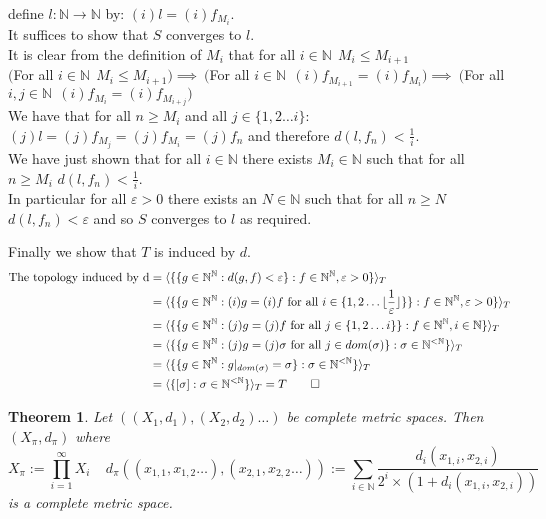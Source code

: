 \documentclass{report}
\newtheorem{theorem}{Theorem}[section]
\begin{document}
define $l:\mathbb{N}\rightarrow\mathbb{N}$ by: $(i)l=(i)f_{M_i}$.\\
It suffices to show that $S$ converges to $l$.\\
It is clear from the definition of $M_i$ that for all $i\in \mathbb{N}\ \  M_i \leq M_{i+1}$\\
$($For all $i\in \mathbb{N}\ \  M_i \leq M_{i+1})\implies\ ($For all $i\in \mathbb{N}\ \ (i)f_{M_{i+1}}=(i)f_{M_{i}}) \implies\ ($For all $i,j\in \mathbb{N}\ \ (i)f_{M_{i}}=(i)f_{M_{i+j}})$\\
We have that for all $n \geq M_i$ and all $j \in \{1,2\ldots i\}$: $(j)l=(j)f_{M_j}=(j)f_{M_i}=(j)f_n$ and therefore $d(l,f_n) < \frac{1}{i}$.\\
We have just shown that for all $i \in \mathbb{N}$ there exists $M_i\in\mathbb{N}$ such that for all $n\geq M_i$ $d(l,f_n)< \frac{1}{i}$.\\
In particular for all $\varepsilon > 0$ there exists an $N\in\mathbb{N}$ such that for all $n\geq N$ $d(l,f_n)<\varepsilon$ and so $S$ converges to $l$ as required.\\\par
Finally we show that $T$ is induced by $d$.
\begin{align*}
\text{The topology induced by d} &=\langle\{\{g\in \mathbb{N}^\mathbb{N}:d(g,f)<\varepsilon\}:f\in \mathbb{N}^\mathbb{N},\varepsilon>0\}\rangle_T\\
&=\langle \{\{g\in \mathbb{N}^\mathbb{N}:(i)g=(i)f \text{ for all } i \in \{1,2 \ldots \lfloor \frac{1}{\varepsilon}\rfloor\}\}:f\in \mathbb{N}^\mathbb{N},\varepsilon>0\}\rangle_T\\
&=\langle\{\{g\in \mathbb{N}^\mathbb{N}:(j)g=(j)f \text{ for all } j \in \{1,2 \ldots i\}\}:f\in \mathbb{N}^\mathbb{N},i\in\mathbb{N}\}\rangle_T\\
&=\langle\{\{g\in \mathbb{N}^\mathbb{N}:(j)g=(j)\sigma \text{ for all } j \in dom(\sigma)\}:\sigma\in \mathbb{N}^{<\mathbb{N}}\}\rangle_T\\
&=\langle\{\{g\in \mathbb{N}^\mathbb{N}:g\vert_{dom(\sigma)}=\sigma\}:\sigma\in \mathbb{N}^{<\mathbb{N}}\}\rangle_T\\
&=\langle\{[\sigma]:\sigma\in \mathbb{N}^{<\mathbb{N}}\}\rangle_T= T \qed
\end{align*}
\begin{theorem} \label{metric product}
Let $((X_1,d_1),(X_2,d_2) \ldots)$ be complete metric spaces. Then $(X_\pi,d_\pi)$ where 
\[X_\pi := \prod_{i=1}^{\infty}{X_i}\ \ \ \ \ d_\pi ((x_{1,1},x_{1,2}\ldots ),(x_{2,1},x_{2,2}\ldots )) := \sum_{i\in \mathbb{N}}{\frac{d_i(x_{1,i},x_{2,i})}{2^i \times (1 + d_i(x_{1,i},x_{2,i}))}}\] is a complete metric space.
\end{theorem}\par
\end{document}
